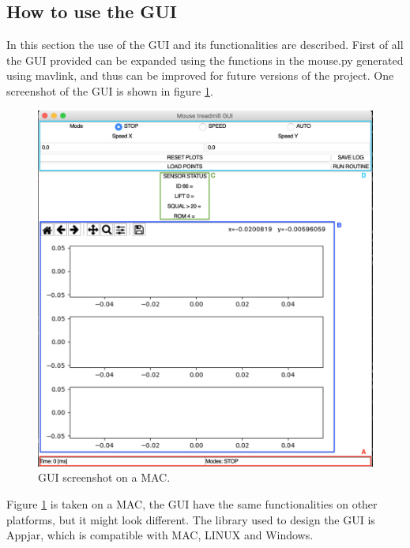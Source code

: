 \documentclass[12pt,a4paper]{article}
\begin{document}
\subsection{How to use the GUI}  
In this section the use of the GUI and its functionalities are described.
First of all the GUI provided can be expanded using the functions in the mouse.py generated using mavlink, and thus can be improved for future versions of the project. One screenshot of the GUI is shown in figure \ref{fig:GUI}.
\begin{figure}[htp]
	\centering
	\includegraphics[width=1\linewidth]{fig/GUI.png}
	\caption{GUI screenshot on a MAC.}\label{fig:GUI}
\end{figure}
Figure \ref{fig:GUI} is taken on a MAC, the GUI have the same functionalities on other platforms, but it might look different. The library used to design the GUI is Appjar, which is compatible with MAC, LINUX and Windows.
\end{document}
